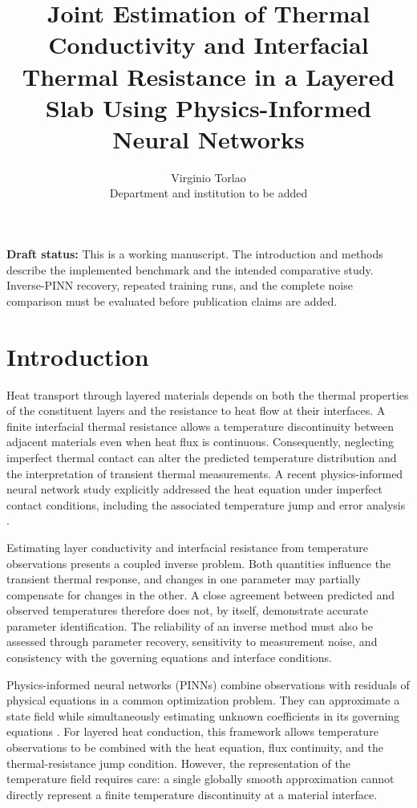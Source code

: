 \documentclass[11pt,a4paper]{article}
\title{Joint Estimation of Thermal Conductivity and Interfacial
Thermal Resistance in a Layered Slab Using
Physics-Informed Neural Networks}
\author{Virginio Torlao\\
\small Department and institution to be added}
\date{}
\newcommand{\draftnote}[1]{%
  \par\medskip
  \noindent\textbf{Draft status:} #1
  \par\medskip
}
\begin{document}
\maketitle

\draftnote{This is a working manuscript.
The introduction and methods describe the implemented benchmark
and the intended comparative study.
Inverse-PINN recovery, repeated training runs, and the complete
noise comparison must be evaluated before publication claims
are added.}


\section{Introduction}

Heat transport through layered materials depends on both the
thermal properties of the constituent layers and the resistance
to heat flow at their interfaces. A finite interfacial thermal
resistance allows a temperature discontinuity between adjacent
materials even when heat flux is continuous. Consequently,
neglecting imperfect thermal contact can alter the predicted
temperature distribution and the interpretation of transient
thermal measurements. A recent physics-informed neural network
study explicitly addressed the heat equation under imperfect
contact conditions, including the associated temperature jump
and error analysis \citep{oh2025}.

Estimating layer conductivity and interfacial resistance from
temperature observations presents a coupled inverse problem.
Both quantities influence the transient thermal response, and
changes in one parameter may partially compensate for changes
in the other. A close agreement between predicted and observed
temperatures therefore does not, by itself, demonstrate accurate
parameter identification. The reliability of an inverse method
must also be assessed through parameter recovery, sensitivity
to measurement noise, and consistency with the governing
equations and interface conditions.

Physics-informed neural networks (PINNs) combine observations
with residuals of physical equations in a common optimization
problem. They can approximate a state field while simultaneously
estimating unknown coefficients in its governing equations
\citep{raissi2019}. For layered heat conduction, this framework
allows temperature observations to be combined with the heat
equation, flux continuity, and the thermal-resistance jump
condition. However, the representation of the temperature field
requires care: a single globally smooth approximation cannot
directly represent a finite temperature discontinuity at a
material interface.
\end{document}
